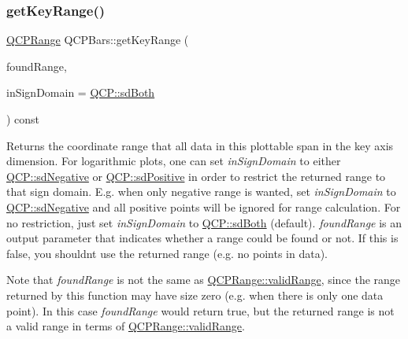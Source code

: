\subsubsection{\texorpdfstring{get\+Key\+Range()}{getKeyRange()}}
{\footnotesize\ttfamily \mbox{\hyperlink{class_q_c_p_range}{Q\+C\+P\+Range}} Q\+C\+P\+Bars\+::get\+Key\+Range (\begin{DoxyParamCaption}\item[{bool \&}]{found\+Range,  }\item[{\mbox{\hyperlink{namespace_q_c_p_afd50e7cf431af385614987d8553ff8a9}{Q\+C\+P\+::\+Sign\+Domain}}}]{in\+Sign\+Domain = {\ttfamily \mbox{\hyperlink{namespace_q_c_p_afd50e7cf431af385614987d8553ff8a9aa38352ef02d51ddfa4399d9551566e24}{Q\+C\+P\+::sd\+Both}}} }\end{DoxyParamCaption}) const\hspace{0.3cm}{\ttfamily [virtual]}}

Returns the coordinate range that all data in this plottable span in the key axis dimension. For logarithmic plots, one can set {\itshape in\+Sign\+Domain} to either \mbox{\hyperlink{namespace_q_c_p_afd50e7cf431af385614987d8553ff8a9a2d18af0bc58f6528d1e82ce699fe4829}{Q\+C\+P\+::sd\+Negative}} or \mbox{\hyperlink{namespace_q_c_p_afd50e7cf431af385614987d8553ff8a9a584784b75fb816abcc627cf743bb699f}{Q\+C\+P\+::sd\+Positive}} in order to restrict the returned range to that sign domain. E.\+g. when only negative range is wanted, set {\itshape in\+Sign\+Domain} to \mbox{\hyperlink{namespace_q_c_p_afd50e7cf431af385614987d8553ff8a9a2d18af0bc58f6528d1e82ce699fe4829}{Q\+C\+P\+::sd\+Negative}} and all positive points will be ignored for range calculation. For no restriction, just set {\itshape in\+Sign\+Domain} to \mbox{\hyperlink{namespace_q_c_p_afd50e7cf431af385614987d8553ff8a9aa38352ef02d51ddfa4399d9551566e24}{Q\+C\+P\+::sd\+Both}} (default). {\itshape found\+Range} is an output parameter that indicates whether a range could be found or not. If this is false, you shouldn\textquotesingle{}t use the returned range (e.\+g. no points in data).

Note that {\itshape found\+Range} is not the same as \mbox{\hyperlink{class_q_c_p_range_ab38bd4841c77c7bb86c9eea0f142dcc0}{Q\+C\+P\+Range\+::valid\+Range}}, since the range returned by this function may have size zero (e.\+g. when there is only one data point). In this case {\itshape found\+Range} would return true, but the returned range is not a valid range in terms of \mbox{\hyperlink{class_q_c_p_range_ab38bd4841c77c7bb86c9eea0f142dcc0}{Q\+C\+P\+Range\+::valid\+Range}}.

